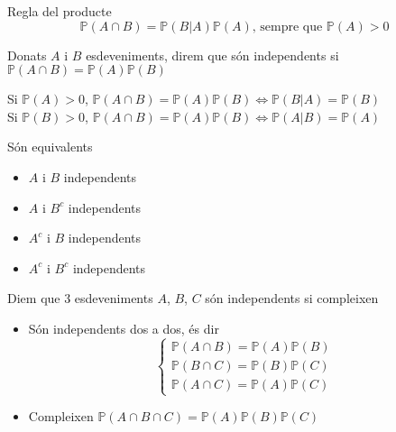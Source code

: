 \documentclass[../main.tex]{subfiles}
\begin{document}
    \begin{teorema}
        Regla del producte
        \begin{displaymath}
            \mathbb{P}\left(A \cap B\right) = \mathbb{P}\left(B|A\right)\mathbb{P}\left(A\right)\text{, sempre que } \mathbb{P}\left(A\right)>0
        \end{displaymath}
    \end{teorema}
    \begin{definicio}
        Donats $A$ i $B$ esdeveniments, direm que són independents si $\mathbb{P}\left(A\cap B\right) = \mathbb{P}\left(A\right)\mathbb{P}\left(B\right)$
    \end{definicio}
    \begin{obs}
        Si $\mathbb{P}\left(A\right) > 0$, $\mathbb{P}\left(A\cap B\right) = \mathbb{P}\left(A\right) \mathbb{P}\left(B\right) \Longleftrightarrow \mathbb{P}\left(B|A\right) = \mathbb{P}\left(B\right)$\\
        Si $\mathbb{P}\left(B\right) > 0$, $\mathbb{P}\left(A\cap B\right) = \mathbb{P}\left(A\right) \mathbb{P}\left(B\right) \Longleftrightarrow \mathbb{P}\left(A|B\right) = \mathbb{P}\left(A\right)$
    \end{obs}
    \begin{proposicio}
        Són equivalents
        \begin{itemize}
            \item $A$ i $B$ independents
            \item $A$ i $B^c$ independents
            \item $A^c$ i $B$ independents
            \item $A^c$ i $B^c$ independents
        \end{itemize}
    \end{proposicio}
    \begin{definicio}
        Diem que $3$ esdeveniments $A$, $B$, $C$ són independents si compleixen
        \begin{itemize}
            \item Són independents dos a dos, és dir
            \begin{displaymath}
                \begin{cases}
                    \mathbb{P}\left(A\cap B\right) = \mathbb{P}\left(A\right)\mathbb{P}\left(B\right)\\
                    \mathbb{P}\left(B\cap C\right) = \mathbb{P}\left(B\right)\mathbb{P}\left(C\right)\\
                    \mathbb{P}\left(A\cap C\right) = \mathbb{P}\left(A\right)\mathbb{P}\left(C\right)
                \end{cases}
            \end{displaymath}
            \item Compleixen $\mathbb{P}\left(A\cap B\cap C\right) = \mathbb{P}\left(A\right)\mathbb{P}\left(B\right)\mathbb{P}\left(C\right)$
        \end{itemize}
    \end{definicio}
\end{document}

